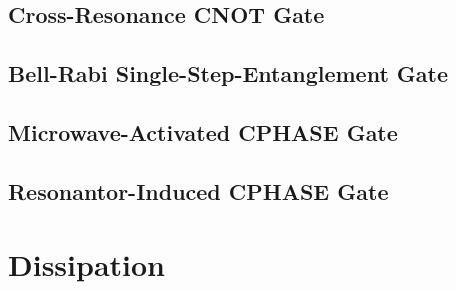 \subsection{Cross-Resonance CNOT Gate}
\cite{ChowPRL2011}

\subsection{Bell-Rabi Single-Step-Entanglement Gate}
\cite{PolettoPRL2012}

\subsection{Microwave-Activated CPHASE Gate}
\cite{ChowNJP2013}

\subsection{Resonantor-Induced CPHASE Gate}

\section{Dissipation}
